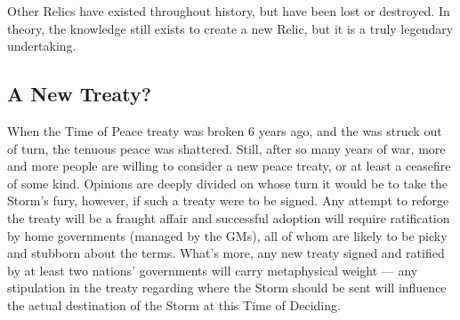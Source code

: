 \documentclass[blue]{GL2020}
\begin{document}
Other Relics have existed throughout history, but have been lost or destroyed. In theory, the knowledge still exists to create a new Relic, but it is a truly legendary undertaking.

\subsection*{A New Treaty?}
When the Time of Peace treaty was broken 6 years ago, and the \pShip{} was struck out of turn, the tenuous peace was shattered. Still, after so many years of war, more and more people are willing to consider a new peace treaty, or at least a ceasefire of some kind. Opinions are deeply divided on whose turn it would be to take the Storm's fury, however, if such a treaty were to be signed. Any attempt to reforge the treaty will be a fraught affair and successful adoption will require ratification by home governments (managed by the GMs), all of whom are likely to be picky and stubborn about the terms. What's more, any new treaty signed and ratified by at least two nations’ governments will carry metaphysical weight — any stipulation in the treaty regarding where the Storm should be sent will influence the actual destination of the Storm at this Time of Deciding.
\end{document}
